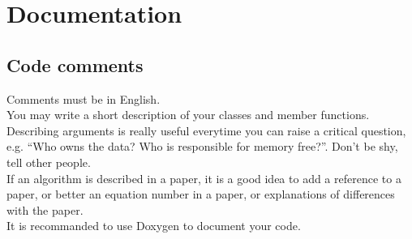 \section{Documentation}

\subsection{Code comments}
Comments must be in English.\\
You may write a short description of your classes and member
functions. Describing arguments is really useful everytime you can
raise a critical question, e.g. ``Who owns the data? Who is
responsible for memory free?''. Don't be shy, tell other people.\\

If an algorithm is described in a paper, it is a good idea to add a
reference to a paper, or better an equation number in a paper, or
explanations of differences with the paper.\\
It is recommanded to use Doxygen to document your code.

